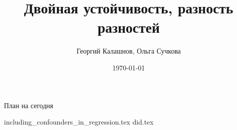 \title{Двойная устойчивость, разность разностей}
\author[Георгий Калашнов, Ольга Сучкова]{Георгий Калашнов, Ольга Сучкова}
\date{\today}



\begin{frame}
  \titlepage
  
\end{frame}


\begin{frame}{План на сегодня} 
\tableofcontents
\end{frame}

{including_confounders_in_regression.tex}
{did.tex}



